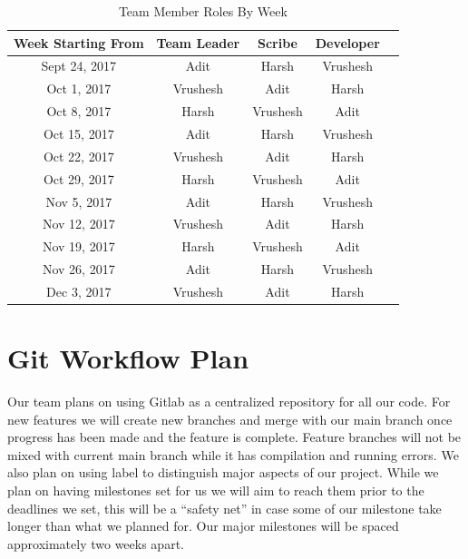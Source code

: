 \documentclass{article}
\begin{document}
\begin{table}[H]
\centering
\begin{tabular}{|c|c|c|c|c} \hline
 \textbf{Week Starting From} & \textbf{Team Leader} &  \textbf{Scribe} & \textbf{Developer}   \\ \hline
 Sept 24, 2017 & Adit & Harsh & Vrushesh  \\ \hline
 Oct 1, 2017 & Vrushesh & Adit & Harsh  \\ \hline
 Oct 8, 2017 & Harsh & Vrushesh & Adit  \\ \hline
 Oct 15, 2017 & Adit & Harsh & Vrushesh \\ \hline
 Oct 22, 2017 & Vrushesh & Adit & Harsh  \\ \hline
 Oct 29, 2017 & Harsh & Vrushesh & Adit  \\ \hline
 Nov 5, 2017 & Adit & Harsh & Vrushesh  \\ \hline
 Nov 12, 2017 & Vrushesh & Adit & Harsh  \\ \hline
 Nov 19, 2017 & Harsh & Vrushesh & Adit  \\ \hline
 Nov 26, 2017 & Adit & Harsh & Vrushesh  \\ \hline
 Dec 3, 2017 & Vrushesh & Adit & Harsh  \\ \hline
\end{tabular}
\caption{Team Member Roles By Week}
\label{TeamMemberRoles}
\end{table}






\section{Git Workflow Plan}

Our team plans on using Gitlab as a centralized repository for all our code. For new features we will create new branches and merge with our main branch once progress has been made and the feature is complete. Feature branches will not be mixed with current main branch while it has compilation and running errors. We also plan on using label to distinguish major aspects of our project. While we plan on having milestones set for us we will aim to reach them prior to the deadlines we set, this will be a “safety net” in case some of our milestone take longer than what we planned for. Our major milestones will be spaced approximately two weeks apart. 
\end{document}
